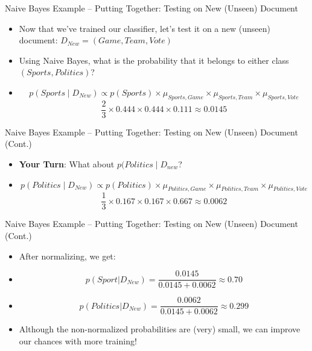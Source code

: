 \documentclass[
  ignorenonframetext,
  aspectratio=169]{beamer}
\begin{document}
\begin{frame}{Naive Bayes Example -- Putting Together: Testing on New
(Unseen) Document}
\label{naive-bayes-example-putting-together-testing-on-new-unseen-document}
\begin{itemize}
\item Now that we've trained our classifier, let's test it on a new (unseen) document: $D_{New} = (Game, Team, Vote)$ \pause 
\item Using Naive Bayes, what is the probability that it belongs to either class $(Sports, Politics)$? \pause
\item[] $$
p(Sports\mid D_{New}) \propto p(Sports) \times \mu_{Sports,Game} \times \mu_{Sports,Team}  \times  \mu_{Sports,Vote}$$ 
$$\frac{2}{3} \times 0.444 \times 0.444 \times 0.111 \approx 0.0145$$ \pause 
\end{itemize}
\end{frame}

\begin{frame}{Naive Bayes Example -- Putting Together: Testing on New
(Unseen) Document (Cont.)}
\label{naive-bayes-example-putting-together-testing-on-new-unseen-document-cont.}
\begin{itemize}
\item \textbf{Your Turn}: What about $p(Politics \mid D_{new}$? \pause
\item[] $$p(Politics\mid D_{New}) \propto p(Politics) \times \mu_{Politics,Game} \times \mu_{Politics,Team}  \times  \mu_{Politics,Vote}$$ 
$$\frac{1}{3} \times 0.167 \times 0.167 \times 0.667 \approx 0.0062$$ 
\end{itemize}
\end{frame}

\begin{frame}{Naive Bayes Example -- Putting Together: Testing on New
(Unseen) Document (Cont.)}
\label{naive-bayes-example-putting-together-testing-on-new-unseen-document-cont.-1}
\begin{itemize}
\item After normalizing, we get: 
\item[] $$p(Sport|D_{New}) = \frac{0.0145}{0.0145+0.0062} \approx 0.70$$ 
\item[]
$$p(Politics|D_{New}) = \frac{0.0062}{0.0145+0.0062} \approx 0.299 $$ \pause
\item[] Although the non-normalized probabilities are (very) small, we can improve our chances with more training! 
\end{itemize}
\end{frame}
\end{document}
